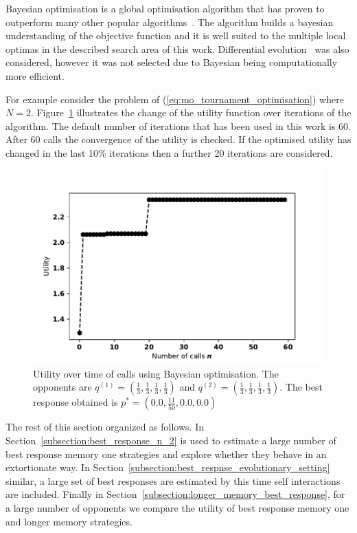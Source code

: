 \documentclass[10pt]{article}
\begin{document}
Bayesian optimisation is a global optimisation algorithm that has proven to
outperform many other popular algorithms~\cite{Jones2001}. The algorithm builds
a bayesian understanding of the objective function and it is well suited to the
multiple local optimas in the described search area of this work. Differential
evolution~\cite{Storn1997} was also considered, however it was not selected due
to Bayesian being computationally more efficient.

For example consider the problem of (\ref{eq:mo_tournament_optimisation}) where
\(N=2\). Figure~\ref{bayesian_example} illustrates the change of the utility
function over iterations of the algorithm. The default number of iterations that
has been used in this work is 60. After 60 calls the convergence of the utility
is checked. If the optimised utility has changed in the last 10\% iterations
then a further 20 iterations are considered.

\begin{figure}[!htbp]
    \begin{center}
    \includegraphics[width=.5\linewidth]{img/bayesian_example.pdf}
    \end{center}
    \caption{Utility over time of calls using Bayesian optimisation. The
    opponents are \(q^{(1)} = (\frac{1}{3}, \frac{1}{3}, \frac{1}{3},
    \frac{1}{3})\) and \(q^{(2)} = (\frac{1}{3}, \frac{1}{3},
    \frac{1}{3}, \frac{1}{3})\). The best response obtained is \(p^* = (0.0, \frac{11}{50}, 0.0, 0.0)\)}
    \label{bayesian_example}
\end{figure}

The rest of this section organized as follows. In
Section~\ref{subsection:best_response_n_2} is used to estimate a large number of
best response memory one strategies and explore whether they behave in an
extortionate way. In Section~\ref{subsection:best_respnse_evolutionary_setting}
similar, a large set of best responses are estimated by this time self
interactions are included. Finally in
Section~\ref{subsection:longer_memory_best_response}, for a large number of
opponents we compare the utility of best response memory one and longer memory
strategies.
\end{document}
